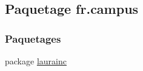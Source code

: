 \hypertarget{namespacefr_1_1campus}{}\subsection{Paquetage fr.\+campus}
\label{namespacefr_1_1campus}
\subsubsection*{Paquetages}
\begin{DoxyCompactItemize}
\item 
package \hyperlink{namespacefr_1_1campus_1_1laurainc}{laurainc}
\end{DoxyCompactItemize}
